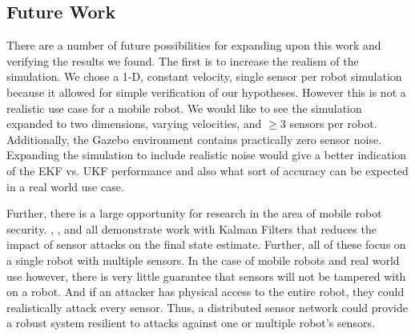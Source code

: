 \documentclass[conference]{IEEEtran} \usepackage[T1]{fontenc} \usepackage[backend=biber, style=ieee]{biblatex}
\begin{document}
\subsection{Future Work}
There are a number of future possibilities for expanding upon this work and verifying the results we found. The first is to increase the realism of the simulation. We chose a 1-D, constant velocity, single sensor per robot simulation because it allowed for simple verification of our hypotheses. However this is not a realistic use case for a mobile robot. We would like to see the simulation expanded to two dimensions, varying velocities, and $\geq 3$ sensors per robot. Additionally, the Gazebo environment contains practically zero sensor noise. Expanding the simulation to include realistic noise would give a better indication of the EKF vs. UKF performance and also what sort of accuracy can be expected in a real world use case.

Further, there is a large opportunity for research in the area of mobile robot security. \cite{bezzo2014attack}, \cite{fawzi2011secure}, and \cite{mo2014resilient} all demonstrate work with Kalman Filters that reduces the impact of sensor attacks on the final state estimate. Further, all of these focus on a single robot with multiple sensors. In the case of mobile robots and real world use however, there is very little guarantee that sensors will not be tampered with on a robot. And if an attacker has physical access to the entire robot, they could realistically attack every sensor. Thus, a distributed sensor network could provide a robust system resilient to attacks against one or multiple robot's sensors. 

\printbibliography
\end{document}
